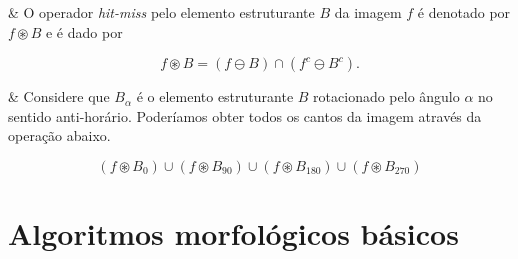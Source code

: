 \begin{easylist}

  & O operador \textit{hit-miss} pelo elemento estruturante $B$ da imagem $f$ é denotado por $f \circledast B$ e é dado por

  \[ f \circledast B = (f \ominus B) \cap (f^c \ominus B^c). \]

  & Considere que $B_\alpha$ é o elemento estruturante $B$ rotacionado pelo ângulo $\alpha$ no sentido anti-horário. Poderíamos obter todos os cantos da imagem através da operação abaixo.

  \[ (f \circledast B_{0})  \cup
     (f \circledast B_{90}) \cup
     (f \circledast B_{180}) \cup
     (f \circledast B_{270})      \]

\end{easylist}


\section{Algoritmos morfológicos básicos}

